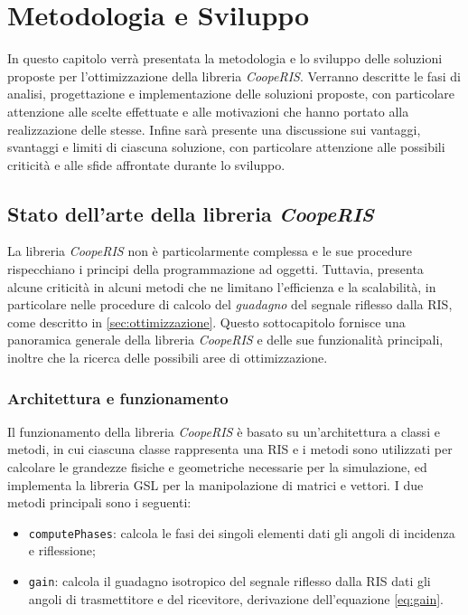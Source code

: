 \chapter{Metodologia e Sviluppo}
\label{ch:metodologiasviluppo}

In questo capitolo verrà presentata la metodologia e lo sviluppo delle soluzioni
proposte per l'ottimizzazione della libreria \textit{CoopeRIS}. Verranno
descritte le fasi di analisi, progettazione e implementazione delle soluzioni proposte,
con particolare attenzione alle scelte effettuate e alle motivazioni che hanno
portato alla realizzazione delle stesse. Infine sarà presente una discussione sui
vantaggi, svantaggi e limiti di ciascuna soluzione, con particolare attenzione alle
possibili criticità e alle sfide affrontate durante lo sviluppo.

\section{Stato dell'arte della libreria \textit{CoopeRIS}}
\label{sec:libreria}

La libreria \textit{CoopeRIS} non è particolarmente complessa e le sue procedure
rispecchiano i principi della programmazione ad oggetti. Tuttavia, presenta alcune
criticità in alcuni metodi che ne limitano l'efficienza e la scalabilità, in
particolare nelle procedure di calcolo del \textit{guadagno} del segnale riflesso
dalla RIS, come descritto in \ref{sec:ottimizzazione}. Questo sottocapitolo fornisce
una panoramica generale della libreria \textit{CoopeRIS} e delle sue
funzionalità principali, inoltre che la ricerca delle possibili aree di ottimizzazione.

\subsection{Architettura e funzionamento}
\label{sec:architettura}

Il funzionamento della libreria \textit{CoopeRIS} è basato su un'architettura a classi
e metodi, in cui ciascuna classe rappresenta una RIS e i metodi sono utilizzati
per calcolare le grandezze fisiche e geometriche necessarie per la simulazione, ed
implementa la libreria GSL\cite{gnugsl} per la manipolazione di matrici e
vettori. I due metodi principali sono i seguenti:

\begin{itemize}
  \item \texttt{computePhases}: calcola le fasi dei singoli elementi dati gli angoli
    di incidenza e riflessione;

  \item \texttt{gain}: calcola il guadagno isotropico del segnale riflesso dalla
    RIS dati gli angoli di trasmettitore e del ricevitore, derivazione dell'equazione
    \ref{eq:gain}.
\end{itemize}

